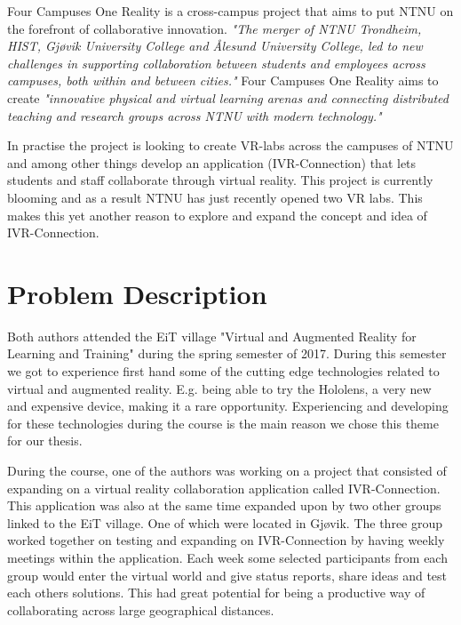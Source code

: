         Four Campuses One Reality is a cross-campus project that aims to put NTNU on the forefront of collaborative innovation. \emph{"The merger of NTNU Trondheim, HIST, Gjøvik University College and Ålesund University College, led to new challenges in supporting collaboration between students and employees across campuses, both within and between cities."} \cite{4C1R-Pitch} Four Campuses One Reality aims to create \emph{"innovative physical and virtual learning arenas and connecting distributed teaching and research groups across NTNU with modern technology."} \cite{4C1R-Pitch} 
                
        In practise the project is looking to create VR-labs across the campuses of NTNU and among other things develop an application (IVR-Connection) that lets students and staff collaborate through virtual reality. This project is currently blooming \cite{4C1R-Geminin} and as a result NTNU has just recently opened two VR labs. \cite{OpenVRLab} This makes this yet another reason to explore and expand the concept and idea of IVR-Connection.
    
    \section{Problem Description}
    
        Both authors attended the EiT village "Virtual and Augmented Reality for Learning and Training" during the spring semester of 2017. During this semester we got to experience first hand some of the cutting edge technologies related to virtual and augmented reality. E.g. being able to try the Hololens, a very new and expensive device, making it a rare opportunity. Experiencing and developing for these technologies during the course is the main reason we chose this theme for our thesis.
                
        During the course, one of the authors was working on a project that consisted of expanding on a virtual reality collaboration application called IVR-Connection. This application was also at the same time expanded upon by two other groups linked to the EiT village. One of which were located in Gjøvik. The three group worked together on testing and expanding on IVR-Connection by having weekly meetings within the application. Each week some selected participants from each group would enter the virtual world and give status reports, share ideas and test each others solutions. This had great potential for being a productive way of collaborating across large geographical distances.
                
